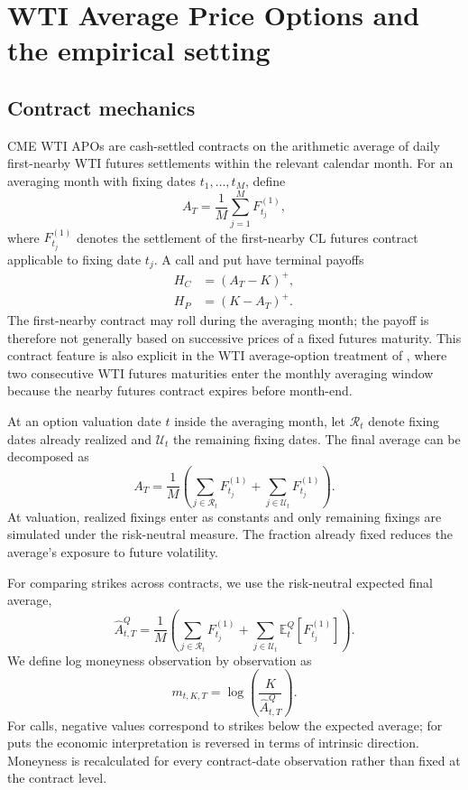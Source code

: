 \section{WTI Average Price Options and the empirical setting}\label{sec:contract}

\subsection{Contract mechanics}

CME WTI APOs are cash-settled contracts on the arithmetic average of daily first-nearby WTI futures settlements within the relevant calendar month. For an averaging month with fixing dates $t_1,\ldots,t_M$, define
\begin{equation}
 A_T=\frac{1}{M}\sum_{j=1}^{M}F^{(1)}_{t_j},
 \label{eq:apo_average}
\end{equation}
where $F^{(1)}_{t_j}$ denotes the settlement of the first-nearby CL futures contract applicable to fixing date $t_j$. A call and put have terminal payoffs
\begin{align}
 H_C&=(A_T-K)^+,\\
 H_P&=(K-A_T)^+.
\end{align}
The first-nearby contract may roll during the averaging month; the payoff is therefore not generally based on successive prices of a fixed futures maturity. This contract feature is also explicit in the WTI average-option treatment of \cite{shirayatakahashi2011}, where two consecutive WTI futures maturities enter the monthly averaging window because the nearby futures contract expires before month-end.

At an option valuation date $t$ inside the averaging month, let $\mathcal R_t$ denote fixing dates already realized and $\mathcal U_t$ the remaining fixing dates. The final average can be decomposed as
\begin{equation}
 A_T=\frac{1}{M}
 \left(
 \sum_{j\in\mathcal R_t}F^{(1)}_{t_j}
 +
 \sum_{j\in\mathcal U_t}F^{(1)}_{t_j}
 \right).
 \label{eq:partial_fixing}
\end{equation}
At valuation, realized fixings enter as constants and only remaining fixings are simulated under the risk-neutral measure. The fraction already fixed reduces the average's exposure to future volatility.

For comparing strikes across contracts, we use the risk-neutral expected final average,
\begin{equation}
 \widehat A^{Q}_{t,T}=
 \frac{1}{M}
 \left(
 \sum_{j\in\mathcal R_t}F^{(1)}_{t_j}
 +
 \sum_{j\in\mathcal U_t}\mathbb E_t^Q[F^{(1)}_{t_j}]
 \right).
 \label{eq:expected_average}
\end{equation}
We define log moneyness observation by observation as
\begin{equation}
 m_{t,K,T}=\log\!\left(\frac{K}{\widehat A^{Q}_{t,T}}\right).
 \label{eq:moneyness}
\end{equation}
For calls, negative values correspond to strikes below the expected average; for puts the economic interpretation is reversed in terms of intrinsic direction. Moneyness is recalculated for every contract-date observation rather than fixed at the contract level.

